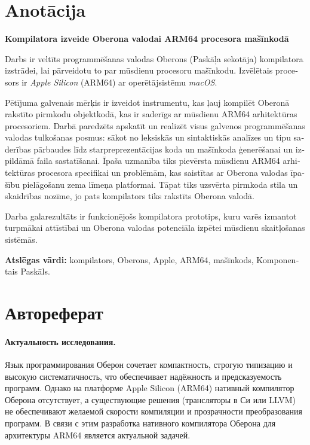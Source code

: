 \documentclass[utf8]{lgu}
\begin{document}
\newpage

\section*{Anotācija}
\begin{latvian}
\firstparskip

\textbf{Kompilatora izveide Oberona valodai ARM64 procesora mašīnkodā}
\vspace{0.5cm}

Darbs ir veltīts programmēšanas valodas Oberons (Paskāļa sekotāja) kompilatora izstrādei, lai pārveidotu to par mūsdienu procesoru mašīnkodu. Izvēlētais procesors ir \textit{Apple Silicon} (ARM64) ar operētājsistēmu \textit{macOS}.

Pētījuma galvenais mērķis ir izveidot instrumentu, kas ļauj kompilēt Oberonā rakstīto pirmkodu objektkodā, kas ir saderīgs ar mūsdienu ARM64 arhitektūras procesoriem. Darbā paredzēts apskatīt un realizēt visus galvenos programmēšanas valodas tulkošanas posmus: sākot no leksiskās un sintaktiskās analīzes un tipu saderības pārbaudes līdz starpreprezentācijas koda un mašīnkoda ģenerēšanai un izpildāmā faila sastatīšanai. Īpaša uzmanība tiks pievērsta mūsdienu ARM64 arhitektūras procesora specifikai un problēmām, kas saistītas ar Oberona valodas īpašību pielāgošanu zema līmeņa platformai. Tāpat tiks uzsvērta pirmkoda stila un skaidrības nozīme, jo pats kompilators tiks rakstīts Oberona valodā.

Darba galarezultāts ir funkcionējošs kompilatora prototips, kuru varēs izmantot turpmākai attīstībai un Oberona valodas potenciāla izpētei mūsdienu skaitļošanas sistēmās.

\vspace{0.5cm}
\textbf{Atslēgas vārdi:} kompilators, Oberons, Apple, ARM64, mašīnkods, Komponentais Paskāls.
\end{latvian}

\newpage

\section*{Автореферат}
\firstparskip

\paragraph{Актуальность исследования.}

Язык программирования Оберон сочетает компактность, строгую типизацию и высокую систематичность, что обеспечивает надёжность и предсказуемость программ. Однако на платформе Apple Silicon (ARM64) нативный компилятор Оберона отсутствует, а существующие решения (трансляторы в Си или LLVM) не обеспечивают желаемой скорости компиляции и прозрачности преобразования программ. В связи с этим разработка нативного компилятора Оберона для архитектуры ARM64 является актуальной задачей.
\end{document}
